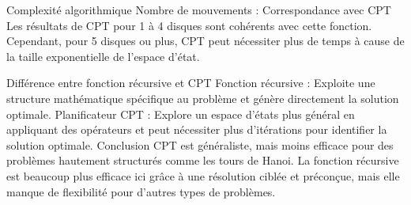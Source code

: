 \documentclass[../CSC_5RO16_TA_TP5.tex]{subfiles}
\begin{document}
Complexité algorithmique
Nombre de mouvements : 
Correspondance avec CPT
Les résultats de CPT pour 1 à 4 disques sont cohérents avec cette fonction. Cependant, pour 5 disques ou plus, CPT peut nécessiter plus de temps à cause de la taille exponentielle de l’espace d’état.

Différence entre fonction récursive et CPT
Fonction récursive : Exploite une structure mathématique spécifique au problème et génère directement la solution optimale.
Planificateur CPT : Explore un espace d’états plus général en appliquant des opérateurs et peut nécessiter plus d’itérations pour identifier la solution optimale.
Conclusion
CPT est généraliste, mais moins efficace pour des problèmes hautement structurés comme les tours de Hanoi.
La fonction récursive est beaucoup plus efficace ici grâce à une résolution ciblée et préconçue, mais elle manque de flexibilité pour d’autres types de problèmes.
\end{document}
